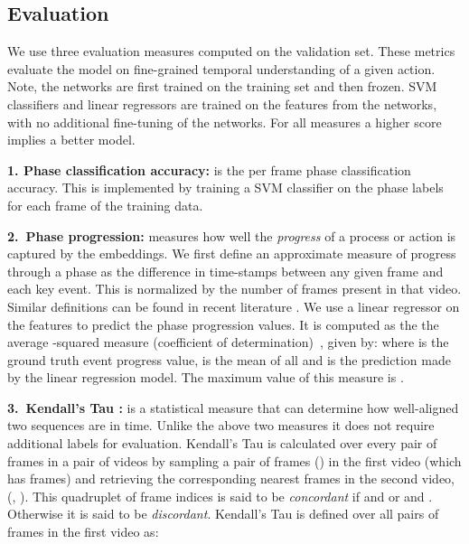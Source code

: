 \documentclass[10pt,twocolumn,letterpaper]{article}
\begin{document}
\subsection{Evaluation}
\label{sec:metrics}
We use three evaluation measures computed on the validation set. These metrics evaluate the model on fine-grained temporal understanding of a given action.
Note, the networks are first trained on the training set and then frozen. SVM classifiers and linear regressors are trained on the features from the networks, with no additional fine-tuning of the networks. 
For all measures a higher score implies a better model. 

\textbf{1. Phase classification accuracy:} is the per frame phase classification accuracy.
This is implemented by training a SVM classifier on  the phase labels for each frame of the
training data.

\textbf{2.\ Phase progression:}
 measures how well the \textit{progress} of a process or action is captured by the embeddings. We first define
an approximate measure of progress through a phase
as the difference in time-stamps between any
given frame and each key event. This is normalized by the number of
frames present in that video. Similar definitions can be found in recent literature \cite{ma2016learning,becattini2017done,heidarivincheh2018action}.
We use a linear regressor on the features to predict the phase progression values. It is computed as the  the average -squared measure (coefficient of
determination)~\cite{wiki:rsquared}, given by:    \setlength{\belowdisplayskip}{0pt} \setlength{\belowdisplayshortskip}{0pt}\setlength{\abovedisplayskip}{1pt} \setlength{\abovedisplayshortskip}{1pt}where  is the ground truth event progress value,  is the
mean of all  and  is the prediction made by the linear
regression model. The maximum value of this measure is .

\textbf{3.\ Kendall's Tau \cite{wiki:kendallstau}:}
is a  statistical measure that can determine how 
well-aligned two sequences are in time. Unlike the above two 
measures it does not require  additional labels for evaluation. 
Kendall's Tau is calculated over every pair of frames in a pair of videos by 
sampling  a pair of frames () in the first video (which has 
frames) and retrieving the corresponding nearest frames in the second
video, (, ). This quadruplet of frame indices  is
said to be \textit{concordant} if  and  or  and
. Otherwise it is said to be \textit{discordant}. Kendall's Tau
is defined over all pairs of frames in the first video as:
\setlength{\belowdisplayskip}{0pt}
\setlength{\belowdisplayshortskip}{1pt}
\setlength{\abovedisplayskip}{0pt}
\setlength{\abovedisplayshortskip}{1pt}
\end{document}

